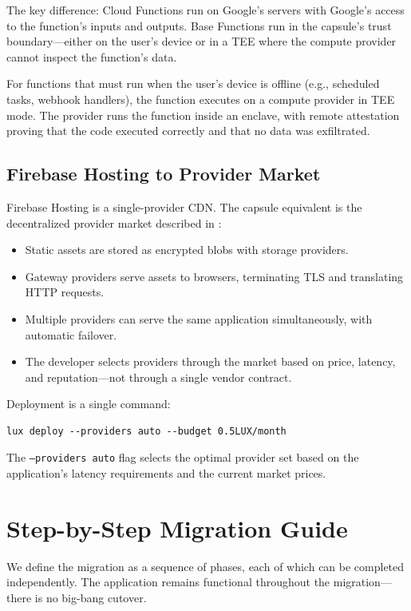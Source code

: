 \documentclass[11pt,a4paper]{article}
\begin{document}
The key difference: Cloud Functions run on Google's servers with Google's
access to the function's inputs and outputs. Base Functions run in the
capsule's trust boundary---either on the user's device or in a TEE where
the compute provider cannot inspect the function's data.

For functions that must run when the user's device is offline (e.g.,
scheduled tasks, webhook handlers), the function executes on a compute
provider in TEE mode. The provider runs the function inside an enclave,
with remote attestation proving that the code executed correctly and that
no data was exfiltrated.

\subsection{Firebase Hosting to Provider Market}

Firebase Hosting is a single-provider CDN. The capsule equivalent is
the decentralized provider market described in \cite{kelling2026cloud}:

\begin{itemize}
    \item Static assets are stored as encrypted blobs with storage providers.
    \item Gateway providers serve assets to browsers, terminating TLS and
    translating HTTP requests.
    \item Multiple providers can serve the same application simultaneously,
    with automatic failover.
    \item The developer selects providers through the market based on
    price, latency, and reputation---not through a single vendor contract.
\end{itemize}

Deployment is a single command:

\begin{lstlisting}
lux deploy --providers auto --budget 0.5LUX/month
\end{lstlisting}

The \texttt{--providers auto} flag selects the optimal provider set based
on the application's latency requirements and the current market prices.

\section{Step-by-Step Migration Guide}\label{sec:migration}

We define the migration as a sequence of phases, each of which can be
completed independently. The application remains functional throughout
the migration---there is no big-bang cutover.
\end{document}
